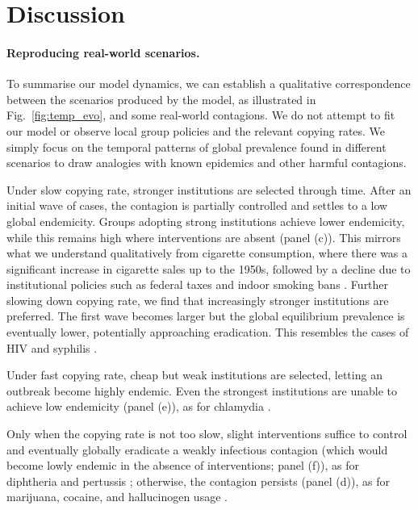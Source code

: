\section{Discussion}
\label{coevo.section.concludingremarks}


\paragraph*{Reproducing real-world scenarios.}

To summarise our model dynamics, we can establish a qualitative correspondence between the scenarios produced by the model, as illustrated in Fig.~\ref{fig:temp_evo}, and some real-world contagions. We do not attempt to fit our model or observe local group policies and the relevant copying rates. We simply focus on the temporal patterns of global prevalence found in different scenarios to draw analogies with known epidemics and other harmful contagions.

Under slow copying rate, stronger institutions are selected through time. 
After an initial wave of cases, the contagion is partially controlled and settles to a low global endemicity. Groups adopting strong institutions achieve lower endemicity, while this remains high where interventions are absent (panel (c)). 
This mirrors what we understand qualitatively from cigarette consumption, where there was a significant increase in cigarette sales up to the 1950s, followed by a decline due to institutional policies such as federal taxes and indoor smoking bans \cite{wong_covid-19_2023,caplow_first_2001}. Further slowing down copying rate, we find that increasingly stronger institutions are preferred. The first wave becomes larger but the global equilibrium prevalence is eventually lower, potentially approaching eradication. 
This resembles the cases of HIV and syphilis \cite{caplow_first_2001}.

Under fast copying rate, cheap but weak institutions are selected, letting an outbreak become highly endemic. Even the strongest institutions are unable to achieve low endemicity (panel (e)), as for chlamydia \cite{centers_for_disease_control_and_prevention_sexually_2014}.

Only when the copying rate is not too slow, slight interventions suffice to control and eventually globally eradicate a weakly infectious contagion (which would become lowly endemic in the absence of interventions; panel (f)), as for diphtheria and pertussis \cite{caplow_first_2001}; otherwise, the contagion persists (panel (d)), as for marijuana, cocaine, and hallucinogen usage \cite{caplow_first_2001}.

